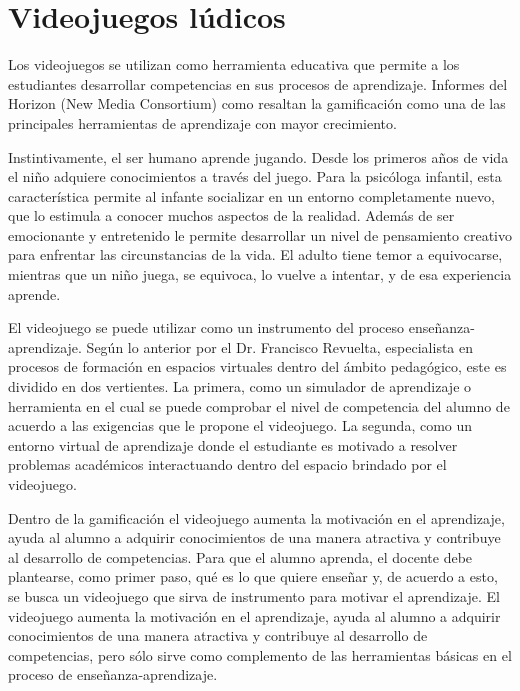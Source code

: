 \section{Videojuegos lúdicos}

Los videojuegos se utilizan como herramienta educativa que permite a los estudiantes desarrollar competencias en sus procesos de aprendizaje. Informes del Horizon (New Media Consortium) como \cite[Games and gamification]{vid07} resaltan la gamificación como una de las principales herramientas de aprendizaje con mayor crecimiento.

Instintivamente, el ser humano aprende jugando. Desde los primeros años de vida el niño adquiere conocimientos a través del juego. Para la psicóloga infantil, esta característica permite al infante socializar en un entorno completamente nuevo, que lo estimula a conocer muchos aspectos de la realidad. Además de ser emocionante y entretenido le permite desarrollar un nivel de pensamiento creativo para enfrentar las circunstancias de la vida. El adulto tiene temor a equivocarse, mientras que un niño juega, se equivoca, lo vuelve a intentar, y de esa experiencia aprende.

El videojuego se puede utilizar como un instrumento del proceso enseñanza-aprendizaje. Según lo anterior por el Dr. Francisco Revuelta, especialista en procesos de formación en espacios virtuales dentro del ámbito pedagógico, este es dividido en dos vertientes. La primera, como un simulador de aprendizaje o herramienta en el cual se puede comprobar el nivel de competencia del alumno de acuerdo a las exigencias que le propone el videojuego. La segunda, como un entorno virtual de aprendizaje donde el estudiante es motivado a resolver problemas académicos interactuando dentro del espacio brindado por el videojuego\cite{vid06}.

Dentro de la gamificación el videojuego aumenta la motivación en el aprendizaje, ayuda al alumno a adquirir conocimientos de una manera atractiva y contribuye al desarrollo de competencias. Para que el alumno aprenda, el docente debe plantearse, como primer paso, qué es lo que quiere enseñar y, de acuerdo a esto, se busca un videojuego que sirva de instrumento para motivar el aprendizaje. El videojuego aumenta la motivación en el aprendizaje, ayuda al alumno a adquirir conocimientos de una manera atractiva y contribuye al desarrollo de competencias, pero sólo sirve como complemento de las herramientas básicas en el proceso de enseñanza-aprendizaje. 
